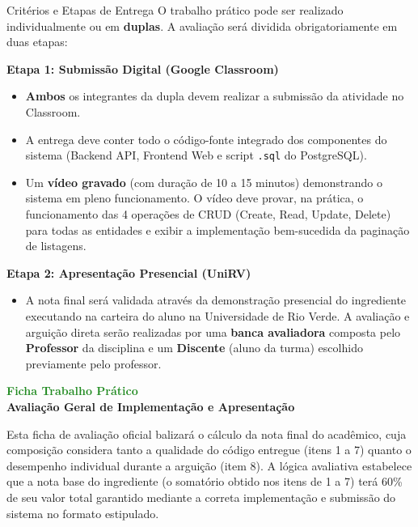 \documentclass[12pt,a4paper]{article}
\begin{document}
\vspace{0.4cm}
\begin{blockbox}{Critérios e Etapas de Entrega}
O trabalho prático pode ser realizado individualmente ou em \textbf{duplas}. A avaliação será dividida obrigatoriamente em duas etapas:

\textbf{Etapa 1: Submissão Digital (Google Classroom)}
\begin{itemize}[leftmargin=*, noitemsep]
    \item \textbf{Ambos} os integrantes da dupla devem realizar a submissão da atividade no Classroom.
    \item A entrega deve conter todo o código-fonte integrado dos componentes do sistema (Backend API, Frontend Web e script \texttt{.sql} do PostgreSQL).
    \item Um \textbf{vídeo gravado} (com duração de 10 a 15 minutos) demonstrando o sistema em pleno funcionamento. O vídeo deve provar, na prática, o funcionamento das 4 operações de CRUD (Create, Read, Update, Delete) para todas as entidades e exibir a implementação bem-sucedida da paginação de listagens.
\end{itemize}

\textbf{Etapa 2: Apresentação Presencial (UniRV)}
\begin{itemize}[leftmargin=*, noitemsep]
    \item A nota final será validada através da demonstração presencial do ingrediente executando na carteira do aluno na Universidade de Rio Verde. A avaliação e arguição direta serão realizadas por uma \textbf{banca avaliadora} composta pelo \textbf{Professor} da disciplina e um \textbf{Discente} (aluno da turma) escolhido previamente pelo professor.
\end{itemize}
\end{blockbox}

\newpage
\begin{center}
    {\huge \textbf{\textcolor{forestgreen}{Ficha Trabalho Prático}}} \\[0.3cm]
    {\large \textbf{Avaliação Geral de Implementação e Apresentação}} \\[0.8cm]
\end{center}

Esta ficha de avaliação oficial balizará o cálculo da nota final do acadêmico, cuja composição considera tanto a qualidade do código entregue (itens 1 a 7) quanto o desempenho individual durante a arguição (item 8). A lógica avaliativa estabelece que a nota base do ingrediente (o somatório obtido nos itens de 1 a 7) terá 60\% de seu valor total garantido mediante a correta implementação e submissão do sistema no formato estipulado.
\end{document}
